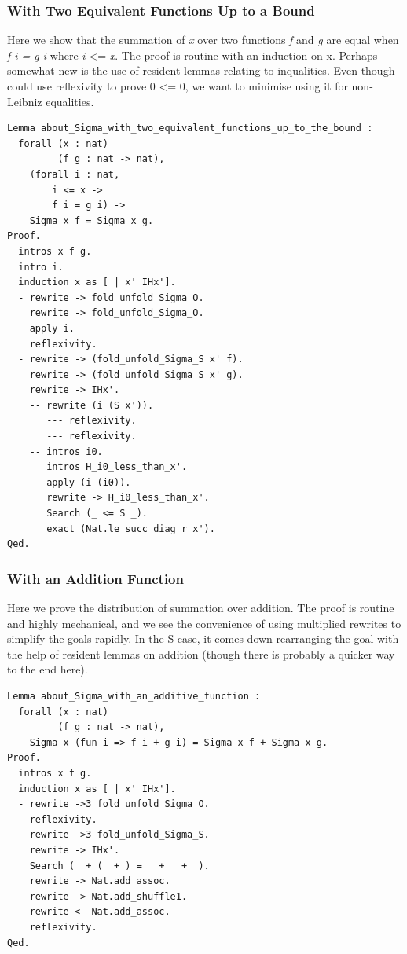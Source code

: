 \documentclass{article}
\begin{document}
\subsubsection{With Two Equivalent Functions Up to a Bound}
Here we show that the summation of \textit{x} over two functions \textit{f} and \textit{g} are equal when \textit{f i = g i} where \textit{i} <= \textit{x}. The proof is routine with an induction on x. Perhaps somewhat new is the use of resident lemmas relating to inqualities. Even though could use reflexivity to prove 0 <= 0, we want to minimise using it for non-Leibniz equalities.

\begin{lstlisting}
Lemma about_Sigma_with_two_equivalent_functions_up_to_the_bound :
  forall (x : nat)
         (f g : nat -> nat),
    (forall i : nat,
        i <= x ->
        f i = g i) ->
    Sigma x f = Sigma x g.
Proof.
  intros x f g.
  intro i.
  induction x as [ | x' IHx'].
  - rewrite -> fold_unfold_Sigma_O.
    rewrite -> fold_unfold_Sigma_O.
    apply i.
    reflexivity.
  - rewrite -> (fold_unfold_Sigma_S x' f).
    rewrite -> (fold_unfold_Sigma_S x' g).
    rewrite -> IHx'.
    -- rewrite (i (S x')).
       --- reflexivity.
       --- reflexivity.
    -- intros i0. 
       intros H_i0_less_than_x'.
       apply (i (i0)).
       rewrite -> H_i0_less_than_x'.
       Search (_ <= S _).
       exact (Nat.le_succ_diag_r x').
Qed.
\end{lstlisting}

\subsubsection{With an Addition Function}
Here we prove the distribution of summation over addition. The proof is routine and highly mechanical, and we see the convenience of using multiplied rewrites to simplify the goals rapidly. In the S case, it comes down rearranging the goal with the help of resident lemmas on addition (though there is probably a quicker way to the end here).

\begin{lstlisting}
Lemma about_Sigma_with_an_additive_function :
  forall (x : nat)
         (f g : nat -> nat),
    Sigma x (fun i => f i + g i) = Sigma x f + Sigma x g.
Proof.
  intros x f g.
  induction x as [ | x' IHx'].
  - rewrite ->3 fold_unfold_Sigma_O. 
    reflexivity.
  - rewrite ->3 fold_unfold_Sigma_S.
    rewrite -> IHx'.
    Search (_ + (_ +_) = _ + _ + _).
    rewrite -> Nat.add_assoc.
    rewrite -> Nat.add_shuffle1.
    rewrite <- Nat.add_assoc.
    reflexivity.
Qed.
\end{lstlisting}
\end{document}
